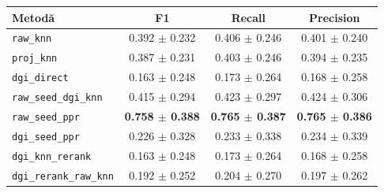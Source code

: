 \documentclass[12pt]{article}
\numberwithin{equation}{section}
\numberwithin{figure}{section}
\numberwithin{table}{section}
\theoremstyle{definition}
\theoremstyle{plain}
\begin{document}
\begin{flushleft}
\small
\setlength{\tabcolsep}{4pt}
\renewcommand{\arraystretch}{0.95}
\captionsetup{type=table,hypcap=false,justification=raggedright,singlelinecheck=false}
\caption{Evaluarea extrinsecă: metrici de recuperare pentru vecinătatea la un salt}
\label{tab:extrinsic-retrieval-one-hop}
\begin{tabular}{lccc}
\toprule
\textbf{Metodă} & \textbf{F1} & \textbf{Recall} & \textbf{Precision} \\
\midrule
\texttt{raw\_knn} & 0.392 $\pm$ 0.232 & 0.406 $\pm$ 0.246 & 0.401 $\pm$ 0.240 \\
\texttt{proj\_knn} & 0.387 $\pm$ 0.231 & 0.403 $\pm$ 0.246 & 0.394 $\pm$ 0.235 \\
\texttt{dgi\_direct} & 0.163 $\pm$ 0.248 & 0.173 $\pm$ 0.264 & 0.168 $\pm$ 0.258 \\
\texttt{raw\_seed\_dgi\_knn} & 0.415 $\pm$ 0.294 & 0.423 $\pm$ 0.297 & 0.424 $\pm$ 0.306 \\
\texttt{raw\_seed\_ppr} & \textbf{0.758 $\pm$ 0.388} & \textbf{0.765 $\pm$ 0.387} & \textbf{0.765 $\pm$ 0.386} \\
\texttt{dgi\_seed\_ppr} & 0.226 $\pm$ 0.328 & 0.233 $\pm$ 0.338 & 0.234 $\pm$ 0.339 \\
\texttt{dgi\_knn\_rerank} & 0.163 $\pm$ 0.248 & 0.173 $\pm$ 0.264 & 0.168 $\pm$ 0.258 \\
\texttt{dgi\_rerank\_raw\_knn} & 0.192 $\pm$ 0.252 & 0.204 $\pm$ 0.270 & 0.197 $\pm$ 0.262 \\
\bottomrule
\end{tabular}
\end{flushleft}
\end{document}

